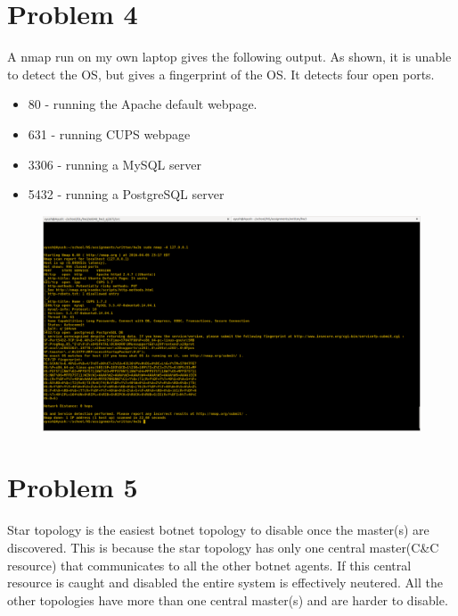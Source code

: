 \documentclass[10pt]{article}
\begin{document}
\section{Problem 4}
A nmap run on my own laptop gives the following output. As shown, it is unable to detect the OS, but gives a fingerprint of the OS. It detects four open ports. 
\begin{itemize}
\item 80 - running the Apache default webpage.
\item 631 - running CUPS webpage
\item 3306 - running a MySQL server
\item 5432 - running a PostgreSQL server
\end{itemize}
\begin{figure}[ht!]
\centering
\includegraphics[width=150mm]{nmap.png}
\end{figure}
\section{Problem 5}
Star topology is the easiest botnet topology to disable once the master(s) are discovered. This is because the star topology has only one central master(C\&C resource) that communicates to all the other botnet agents. If this central resource is caught and disabled the entire system is effectively neutered. All the other topologies have more than one central master(s) and are harder to disable.
\end{document}
